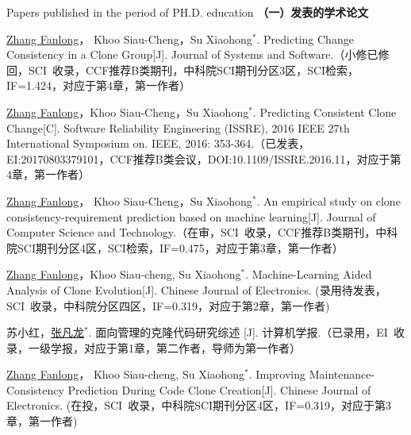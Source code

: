 
 {Papers
published in the period of PH.D. education}
\noindent\textbf{（一）发表的学术论文}
\begin{publist}
\item
\underline{Zhang Fanlong}， Khoo Siau-Cheng，Su Xiaohong{$^*$}. Predicting Change Consistency in a Clone Group[J]. Journal of Systems and Software.（小修已修回，SCI~收录，CCF推荐B类期刊，中科院SCI期刊分区3区，SCI检索，IF=1.424，对应于第4章，第一作者）

\item
\underline{Zhang Fanlong}，Khoo Siau-Cheng，Su Xiaohong{$^*$}. Predicting Consistent Clone Change[C]. Software Reliability Engineering (ISSRE), 2016 IEEE 27th International Symposium on. IEEE, 2016: 353-364.（已发表，EI:20170803379101，CCF推荐B类会议，DOI:10.1109/ISSRE.2016.11，对应于第4章，第一作者）

\item
\underline{Zhang Fanlong}， Khoo Siau-Cheng，Su Xiaohong{$^*$}. An empirical study on clone consistency-requirement prediction based on machine learning[J]. Journal of Computer Science and Technology.（在审，SCI~收录，CCF推荐B类期刊，中科院SCI期刊分区4区，SCI检索，IF=0.475，对应于第3章，第一作者）

\item
\underline{Zhang Fanlong}，Khoo Siau-cheng, Su Xiaohong{$^*$}. Machine-Learning Aided Analysis of Clone Evolution[J]. Chinese Journal of Electronics. (录用待发表，SCI~收录，中科院分区四区，IF=0.319，对应于第2章，第一作者)

\item 
苏小红，\underline{张凡龙}{$^*$}. 面向管理的克隆代码研究综述 [J]. 计算机学报.（已录用，EI~收录，一级学报，对应于第1章，第二作者，导师为第一作者）

\item
\underline{Zhang Fanlong}， Khoo Siau-cheng, Su Xiaohong{$^*$}. Improving Maintenance-Consistency Prediction During Code Clone Creation[J]. Chinese Journal of Electronics. (在投，SCI~收录，中科院SCI期刊分区4区，IF=0.319，对应于第3章，第一作者)



\end{publist}
